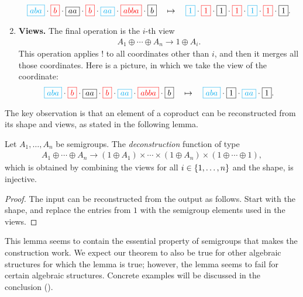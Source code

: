 \begin{enumerate}
\begin{align*}
            {\color{cyan}\boxed{aba}} \cdot 
            {\color{red}\boxed{b}} \cdot 
            \boxed{aa} \cdot 
            {\color{red}\boxed{b}} \cdot 
            {\color{cyan}\boxed{aa}} \cdot 
            {\color{red}\boxed{abba}} \cdot 
            \boxed{b}
            \quad \mapsto \quad  
            {\color{cyan}\boxed{1}} \cdot 
            {\color{red}\boxed{1}} \cdot 
            \boxed{1} \cdot 
            {\color{red}\boxed{1}} \cdot 
            {\color{cyan}\boxed{1}} \cdot 
            {\color{red}\boxed{1}} \cdot 
            \boxed{1}.
        \end{align*}
        \item \textbf{Views.} The final operation is the $i$-th view 
        \begin{align*}
        A_1 \oplus \cdots \oplus A_n \to 1 \oplus A_i.
        \end{align*}
        This operation applies $!$ to all coordinates other than $i$, and then it merges all those coordinates. Here is a picture, in which we take the view of the  coordinate:
        \begin{align*}
            {\color{cyan}\boxed{aba}} \cdot 
            {\color{red}\boxed{b}} \cdot 
            \boxed{aa} \cdot 
            {\color{red}\boxed{b}} \cdot 
            {\color{cyan}\boxed{aa}} \cdot 
            {\color{red}\boxed{abba}} \cdot 
            \boxed{b}
            \quad \mapsto \quad  
            {\color{cyan}\boxed{aba}} \cdot 
            {\boxed{1}} \cdot 
            {\color{cyan}\boxed{aa}} \cdot 
            \boxed{1}.
        \end{align*}
        
\end{enumerate}




The key observation is that an element of a coproduct can be reconstructed from its shape and views, as stated in the following lemma. 

\begin{proposition}
\label{prop:views} Let $A_1,\ldots,A_n$ be semigroups. The \emph{deconstruction} function of type
\begin{align*}
A_1 \oplus \cdots \oplus A_n \longrightarrow (1 \oplus A_1) \times \cdots \times (1 \oplus A_n) \times (1 \oplus \cdots \oplus 1),
\end{align*}
which is obtained by combining the views for all $i \in \{1,\ldots,n\}$ and the shape, is injective. 
\end{proposition}
\begin{proof}
    The input can be reconstructed from the output as follows.
    Start with the shape, and replace the entries from $1$ with the semigroup elements used in the views.
\end{proof}
This lemma seems to contain the essential property of semigroups that makes the construction work. We expect our theorem to also be true for other algebraic structures for which the lemma is true; however, the lemma seems to fail for certain algebraic structures. Concrete examples will be discussed in the conclusion ().

